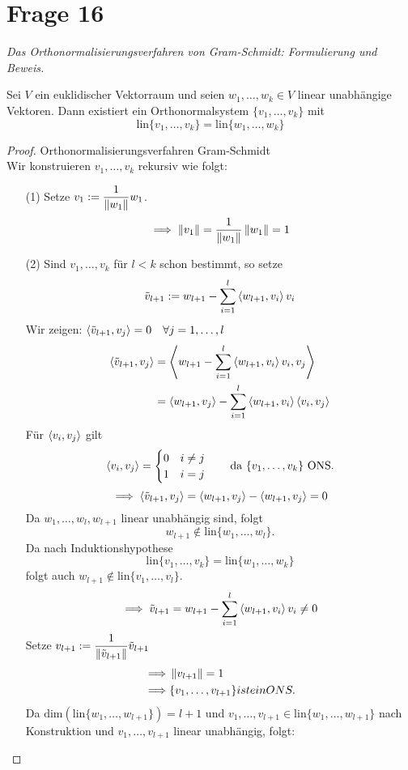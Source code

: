 \section{Frage 16}
\textit{Das Orthonormalisierungsverfahren von Gram-Schmidt: Formulierung und Beweis.}
\begin{theorem}
    Sei $V$ ein euklidischer Vektorraum und seien $w_1,\dots, w_k\in V$ linear unabhängige Vektoren.
    Dann existiert ein Orthonormalsystem $\{v_1,\dots,v_k\}$ mit
    \[
        \mathrm{lin}\{v_1,\dots,v_k\} = \mathrm{lin}\{w_1,\dots,w_k\}
    \]
\end{theorem}
\begin{proof}Orthonormalisierungsverfahren Gram-Schmidt\\
    Wir konstruieren $v_1,\dots,v_k$ rekursiv wie folgt:
    \begin{enumerate}
        \item[(1)] Setze $v_1 := \displaystyle \frac{1}{\left\lVert w_1 \right\rVert} w_1$.
        \[
            \implies \left\lVert v_1 \right\rVert = \frac{1}{\left\lVert w_1 \right\rVert}\left\lVert w_1 \right\rVert = 1
        \]
        \item[(2)] Sind $v_1,\dots,v_k$ für $l < k$ schon bestimmt, so setze
        \[
            \tilde{v}_{l+1} := w_{l+1} - \sum_{i = 1}^{l}\left\langle w_{l+1},v_i \right\rangle v_i
        \]
        Wir zeigen: $\left\langle \tilde{v}_{l+1},v_j \right\rangle=0\quad\forall j = 1,\dots,l$
        \begin{align*}
            \left\langle \tilde{v}_{l+1},v_j \right\rangle &= \left\langle w_{l+1} - \sum_{i=1}^{l}\left\langle w_{l+1},v_i \right\rangle v_i,v_j \right\rangle\\
            &=  \left\langle w_{l+1},v_j \right\rangle - \sum_{i=1}^{l}\left\langle w_{l+1},v_i \right\rangle\left\langle v_i,v_j \right\rangle
        \end{align*}
        Für $\left\langle v_i,v_j \right\rangle$ gilt
        \[
            \left\langle v_i,v_j \right\rangle = \begin{cases}
                0 & i\neq j\\
                1 & i = j
            \end{cases}\qquad \text{da }\{v_1,\dots,v_k\} \text{ ONS}.
        \]
        \[
            \implies \left\langle \tilde{v}_{l+1},v_j \right\rangle = \left\langle w_{l+1},v_j \right\rangle - \left\langle w_{l+1},v_j \right\rangle = 0
        \]
        Da $w_1,\dots,w_l,w_{l+1}$ linear unabhängig sind, folgt
        \[
            w_{l+1}\notin \mathrm{lin}\{w_1,\dots,w_l\}.
        \]
        Da nach Induktionshypothese
        \[
        \mathrm{lin}\{v_1,\dots,v_k\} = \mathrm{lin}\{w_1,\dots,w_k\}
        \]
        folgt auch $w_{l+1} \notin \mathrm{lin}\{v_1,\dots,v_l\}$.
        \[
            \implies \tilde{v}_{l+1} = w_{l+1} - \sum_{i=1}^{l}\left\langle w_{l+1},v_i \right\rangle v_i\neq 0
        \]
        Setze $v_{l+1} := \displaystyle \frac{1}{\left\lVert \tilde{v}_{l+1} \right\rVert}\tilde{v}_{l+1}$
        \begin{align*}
            \implies &\left\lVert v_{l+1} \right\rVert = 1\\
            \implies &\{v_1,\dots,v_{l+1}\} ist ein ONS.
        \end{align*}
        Da $\mathrm{dim}(\mathrm{lin}\{w_1,\dots,w_{l+1}\}) = l+1$ und $v_1,\dots,v_{l+1}\in\mathrm{lin}\{w_1,\dots,w_{l+1}\}$
        nach Konstruktion und $v_1,\dots,v_{l+1}$ linear unabhängig, folgt:


\end{enumerate}
\end{proof}
